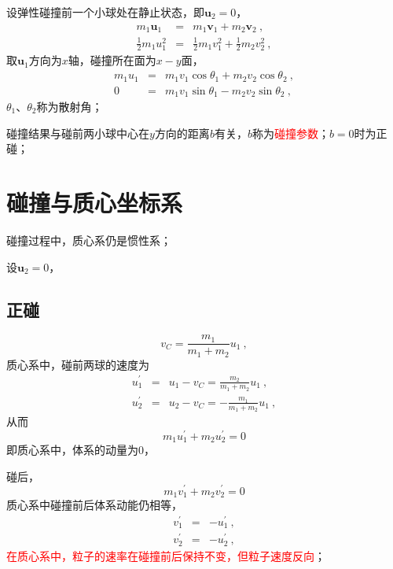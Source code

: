 \documentclass[12pt,a4paper]{article}
\renewcommand{\vec}[1]{\boldsymbol{#1}}
\begin{document}
设弹性碰撞前一个小球处在静止状态，即$\vec{u}_2 = 0$，
\begin{eqnarray}
\nonumber m_1 \vec{u}_1 &=& m_1 \vec{v}_1 +  m_2 \vec{v}_2 ~,\\
\frac{1}{2} m_1 u_1^2 &=& \frac{1}{2} m_1 v_1^2 +\frac{1}{2} m_2 v_2^2 ~,
\end{eqnarray}
取$\vec{u}_1$方向为$x$轴，碰撞所在面为$x-y$面，
\begin{eqnarray}
m_1 u_1 &=& m_1 v_1 \cos \theta_1 +m_2 v_2 \cos \theta_2 ~, \\
0 &=& m_1 v_1 \sin \theta_1 -m_2 v_2 \sin \theta_2 ~, 
\end{eqnarray}
$\theta_1$、$\theta_2$称为散射角；

碰撞结果与碰前两小球中心在$y$方向的距离$b$有关，$b$称为\textcolor{red}{碰撞参数}；$b = 0$时为正碰；

\section{碰撞与质心坐标系}
碰撞过程中，质心系仍是惯性系；

设$\vec{u}_2 = 0$，

\subsection{正碰}
\begin{equation}
v_C = \frac{m_1}{m_1 +m_2} u_1 ~,
\end{equation}
质心系中，碰前两球的速度为
\begin{eqnarray}
\nonumber u_1^{\prime} &=& u_1 -v_C = \frac{m_2}{m_1+m_2} u_1 ~, \\
u_2^{\prime} &=& u_2 -v_C = -\frac{m_1}{m_1 +m_2} u_1 ~, 
\end{eqnarray}
从而
\begin{equation}
m_1 u_1^{\prime} + m_2 u_2^{\prime} = 0
\end{equation}
即质心系中，体系的动量为$0$，

碰后，
\begin{equation}
m_1 v_1^{\prime} + m_2 v_2^{\prime} = 0
\end{equation}
质心系中碰撞前后体系动能仍相等，
\begin{eqnarray}
\nonumber v_1^{\prime} &=& -u_1^{\prime}  ~, \\
v_2^{\prime}  &=& -u_2^{\prime}  ~,
\end{eqnarray}
\textcolor{red}{在质心系中，粒子的速率在碰撞前后保持不变，但粒子速度反向}；
\end{document}
